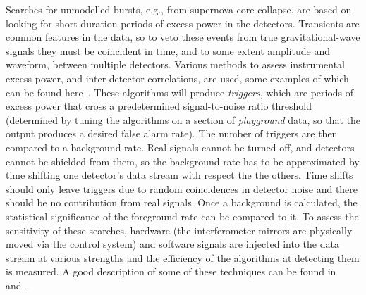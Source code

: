 \documentclass{article}
\begin{document}
Searches for unmodelled bursts, e.g., from supernova core-collapse, are based on
looking for short duration periods of excess power in the detectors. Transients
are common features in the data, so to veto these events from true gravitational-wave signals they must be coincident in time, and to some extent amplitude and
waveform, between multiple detectors. Various methods to assess instrumental
excess power, and inter-detector correlations, are used, some examples of which
can be found here~\cite{Klimenko:2004, Anderson:2001, Searle:2008, McNabb:2004,
Cadonati:2004, Chatterji:2004, Chatterji:2006}. These algorithms will produce
\textit{triggers}, which are periods of excess power that cross a predetermined
signal-to-noise ratio threshold (determined by tuning the algorithms on a
section of \textit{playground} data, so that the output produces a desired false
alarm rate). The number of triggers are then compared to a background rate. Real
signals cannot be turned off, and detectors cannot be shielded from them, so the
background rate has to be approximated by time shifting one detector's data
stream with respect the the others. Time shifts should only leave triggers due
to random coincidences in detector noise and there should be no contribution
from real signals. Once a background is calculated, the statistical significance
of the foreground rate can be compared to it. To assess the sensitivity of these
searches, hardware (the interferometer mirrors are physically moved via the
control system) and software signals are injected into the data stream at
various strengths and the efficiency of the algorithms at detecting them is
measured. A good description of some of these techniques can be found in
\cite{Abbott:2004b} and~\cite{Abbott:2006a}.
\end{document}
